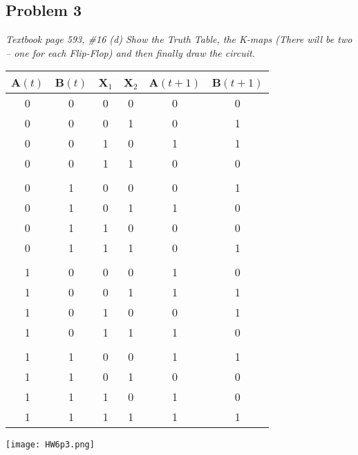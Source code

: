 \documentclass[a4paper,man,natbib]{apa6}
\begin{document}
\subsection{Problem 3}
\emph{ Textbook page 593, \#16 (d) Show the Truth Table, the K-maps (There will be two – one for each Flip-Flop) and then finally draw the circuit.}
\singlespacing
\begin{center}
\begin{tabular}{ c c c c | c c }
	A$(t)$ & B$(t)$ & X$_1$ & X$_2$ & A$(t+1)$ & B$(t+1)$ \\
	\hline
       0   &    0   &   0   &   0   &     0    &  0 \\
       0   &    0   &   0   &   1   &     0    &  1 \\
       0   &    0   &   1   &   0   &     1    &  1 \\
       0   &    0   &   1   &   1   &     0    &  0 \\
&&&&&\\
       0   &    1   &   0   &   0   &     0    &  1 \\
       0   &    1   &   0   &   1   &     1    &  0 \\
       0   &    1   &   1   &   0   &     0    &  0 \\
       0   &    1   &   1   &   1   &     0    &  1 \\
&&&&&\\
       1   &    0   &   0   &   0   &     1    &  0 \\
       1   &    0   &   0   &   1   &     1    &  1 \\
       1   &    0   &   1   &   0   &     0    &  1 \\
       1   &    0   &   1   &   1   &     1    &  0 \\
&&&&&\\
       1   &    1   &   0   &   0   &     1    &  1 \\
       1   &    1   &   0   &   1   &     0    &  0 \\
       1   &    1   &   1   &   0   &     1    &  0 \\
       1   &    1   &   1   &   1   &     1    &  1 \\
\end{tabular}

\kvnoindex
\begin{minipage}{2.5in}
\end{minipage}
\begin{minipage}{2.5in}
\end{minipage}

\texttt{[image: HW6p3.png]}
\end{center}
\doublespacing
\clearpage
\end{document}

